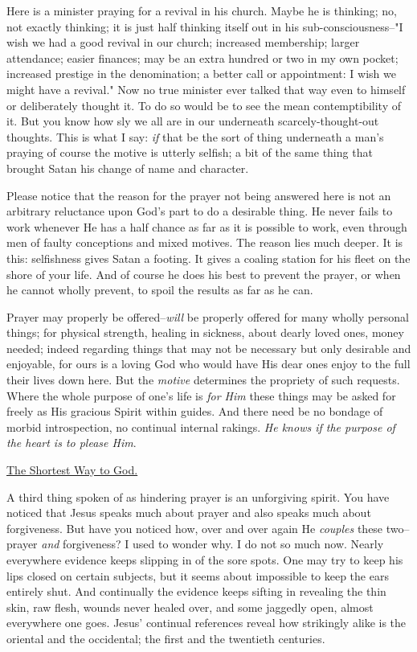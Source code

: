Here is a minister praying for a revival in his church. Maybe he is
thinking; no, not exactly thinking; it is just half thinking itself out in
his sub-consciousness--"I wish we had a good revival in our church;
increased membership; larger attendance; easier finances; may be an extra
hundred or two in my own pocket; increased prestige in the denomination; a
better call or appointment: I wish we might have a revival." Now no true
minister ever talked that way even to himself or deliberately thought it.
To do so would be to see the mean contemptibility of it. But you know how
sly we all are in our underneath scarcely-thought-out thoughts. This is
what I say: \textit{if} that be the sort of thing underneath a man's praying of
course the motive is utterly selfish; a bit of the same thing that brought
Satan his change of name and character.

Please notice that the reason for the prayer not being answered here is
not an arbitrary reluctance upon God's part to do a desirable thing. He
never fails to work whenever He has a half chance as far as it is possible
to work, even through men of faulty conceptions and mixed motives. The
reason lies much deeper. It is this: selfishness gives Satan a footing. It
gives a coaling station for his fleet on the shore of your life. And of
course he does his best to prevent the prayer, or when he cannot wholly
prevent, to spoil the results as far as he can.

Prayer may properly be offered--\textit{will} be properly offered for many wholly
personal things; for physical strength, healing in sickness, about dearly
loved ones, money needed; indeed regarding things that may not be
necessary but only desirable and enjoyable, for ours is a loving God who
would have His dear ones enjoy to the full their lives down here. But the
\textit{motive} determines the propriety of such requests. Where the whole
purpose of one's life is \textit{for Him} these things may be asked for freely as
His gracious Spirit within guides. And there need be no bondage of morbid
introspection, no continual internal rakings. \textit{He knows if the purpose of
the heart is to please Him}.



\underline{The Shortest Way to God.}


A third thing spoken of as hindering prayer is an unforgiving spirit. You
have noticed that Jesus speaks much about prayer and also speaks much
about forgiveness. But have you noticed how, over and over again He
\textit{couples} these two--prayer \textit{and} forgiveness? I used to wonder why. I do
not so much now. Nearly everywhere evidence keeps slipping in of the sore
spots. One may try to keep his lips closed on certain subjects, but it
seems about impossible to keep the ears entirely shut. And continually the
evidence keeps sifting in revealing the thin skin, raw flesh, wounds
never healed over, and some jaggedly open, almost everywhere one goes.
Jesus' continual references reveal how strikingly alike is the oriental
and the occidental; the first and the twentieth centuries.

